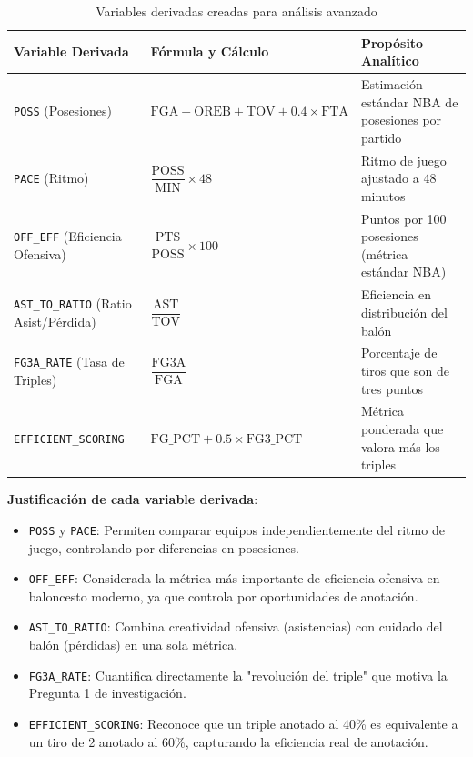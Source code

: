 \documentclass[12pt]{article}
\begin{document}
\begin{table}[H]
\centering
\begin{tabular}{|p{}|p{}|p{}|}
\hline
\textbf{Variable Derivada} & \textbf{Fórmula y Cálculo} & \textbf{Propósito Analítico} \\
\hline
\texttt{POSS} (Posesiones) & $ \text{FGA} - \text{OREB} + \text{TOV} + 0.4 \times \text{FTA} $ & Estimación estándar NBA de posesiones por partido\\
\hline
\texttt{PACE} (Ritmo) & $ \dfrac{\text{POSS}}{\text{MIN}} \times 48 $ & Ritmo de juego ajustado a 48 minutos\\
\hline
\texttt{OFF\_EFF} (Eficiencia Ofensiva) & $ \dfrac{\text{PTS}}{\text{POSS}} \times 100 $ & Puntos por 100 posesiones (métrica estándar NBA)\\
\hline
\texttt{AST\_TO\_RATIO} (Ratio Asist/Pérdida) & $ \dfrac{\text{AST}}{\text{TOV}} $ & Eficiencia en distribución del balón\\
\hline
\texttt{FG3A\_RATE} (Tasa de Triples) & $ \dfrac{\text{FG3A}}{\text{FGA}} $ & Porcentaje de tiros que son de tres puntos\\
\hline
\texttt{EFFICIENT\_SCORING} & $ \text{FG\_PCT} + 0.5 \times \text{FG3\_PCT} $ & Métrica ponderada que valora más los triples\\
\hline
\end{tabular}
\caption{Variables derivadas creadas para análisis avanzado}
\label{tab:variables-derivadas}
\end{table}

\textbf{Justificación de cada variable derivada}:

\begin{itemize}
\item \texttt{POSS} y \texttt{PACE}: Permiten comparar equipos independientemente del ritmo de juego, controlando por diferencias en posesiones.

\item \texttt{OFF\_EFF}: Considerada la métrica más importante de eficiencia ofensiva en baloncesto moderno, ya que controla por oportunidades de anotación.

\item \texttt{AST\_TO\_RATIO}: Combina creatividad ofensiva (asistencias) con cuidado del balón (pérdidas) en una sola métrica.

\item \texttt{FG3A\_RATE}: Cuantifica directamente la "revolución del triple" que motiva la Pregunta 1 de investigación.

\item \texttt{EFFICIENT\_SCORING}: Reconoce que un triple anotado al 40\% es equivalente a un tiro de 2 anotado al 60\%, capturando la eficiencia real de anotación.
\end{itemize}
\end{document}
